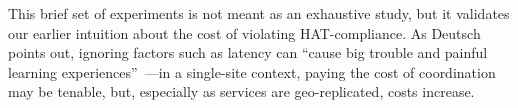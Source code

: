 This brief set of experiments is not meant as an exhaustive study, but
it validates our earlier intuition about the cost of violating
HAT-compliance. As Deutsch points out, ignoring factors such as
latency can ``cause big trouble and painful learning
experiences''~\cite{fallacies-deutsch}---in a single-site context,
paying the cost of coordination may be tenable, but, especially as
services are geo-replicated,  costs increase. 
